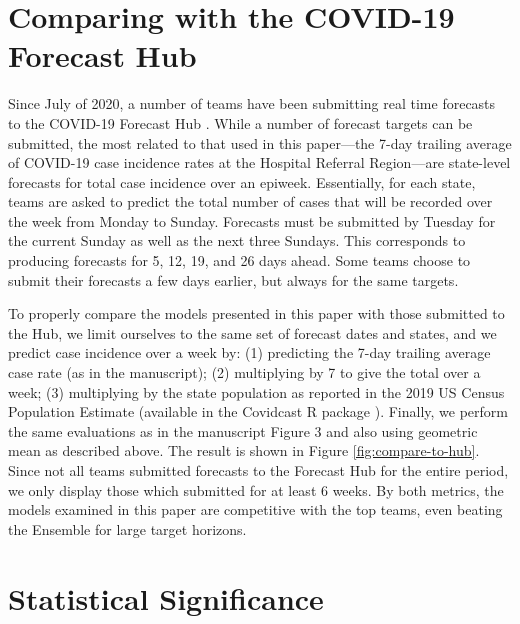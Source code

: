 \section{Comparing with the COVID-19 Forecast Hub}

Since July of 2020, a number of teams have been submitting real time forecasts
to the COVID-19 Forecast Hub \cite{ForecastHub}. While a number of forecast
targets can be submitted, the most related to that used in this paper---the
7-day trailing average of COVID-19 case incidence rates at the Hospital Referral
Region---are state-level forecasts for total case incidence over an epiweek.
Essentially, for each state, teams are asked to predict the total number of
cases that will be recorded over the week from Monday to Sunday. Forecasts must
be submitted by Tuesday for the current Sunday as well as the next three
Sundays. This corresponds to producing forecasts for 5, 12, 19, and 26 days
ahead. Some teams choose to submit their forecasts a few days earlier, but
always for the same targets.

To properly compare the models presented in this paper with those submitted to
the Hub, we limit ourselves to the same set of forecast dates and states, and
we predict case incidence over a week by: (1) predicting the 7-day trailing
average case rate (as in the manuscript);
(2) multiplying by 7 to give the total over a week; (3) multiplying by the state
population as reported in the 2019 US Census Population Estimate (available in
the Covidcast R package \cite{CovidcastR}). Finally, we perform the same
evaluations as in the manuscript Figure 3 and also using geometric mean as
described above. The result is shown in Figure \ref{fig:compare-to-hub}. Since
not all teams submitted forecasts to the Forecast Hub for the entire period, we
only display those which submitted for at least 6 weeks. By both metrics,
the models examined in this paper are competitive with the top teams, even
beating the Ensemble for large target horizons.

\section{Statistical Significance}

